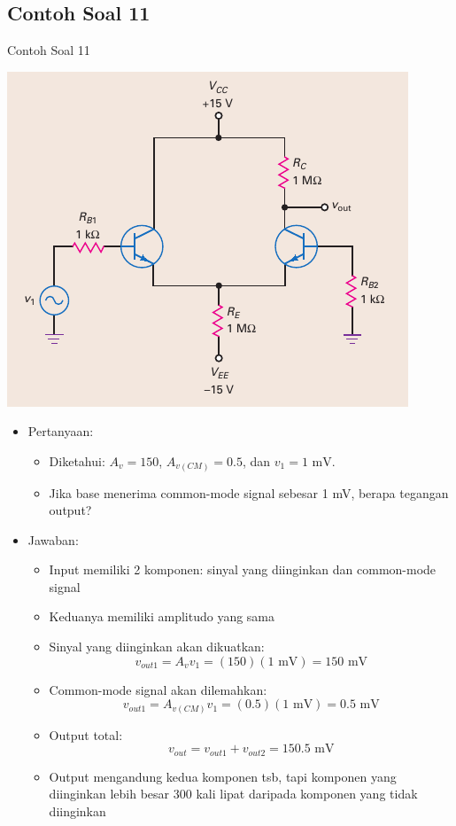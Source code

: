 \documentclass[aspectratio=169]{beamer}
\begin{document}
\subsection{Contoh Soal 11}
\begin{frame}{Contoh Soal 11}
	\begin{multicols}{2}
		\begin{center}
			\includegraphics[width=\linewidth, height=0.7\textheight]{gambar/01.diff-amp/01.fig22}
		\end{center}
		\columnbreak
		\begin{itemize}
			\item Pertanyaan:
			\begin{itemize}
				\item Diketahui: $ A_v = 150 $, $ A_{v(CM)} = 0.5 $, dan $ v_1 = 1 \text{ mV} $.
				\item Jika base menerima common-mode signal sebesar 1 mV, berapa tegangan output?
			\end{itemize}
			\item Jawaban:
			\begin{itemize}
				\item Input memiliki 2 komponen: sinyal yang diinginkan dan common-mode signal
				\item Keduanya memiliki amplitudo yang sama
				\item Sinyal yang diinginkan akan dikuatkan:
				\[ v_{out1} = A_v v_1 = (150)(1 \text{ mV}) = 150 \text{ mV} \]
				\item Common-mode signal akan dilemahkan:
				\[ v_{out1} = A_{v(CM)} v_1 = (0.5)(1 \text{ mV}) = 0.5 \text{ mV} \]
				\item Output total:
				\[ v_{out} = v_{out1} + v_{out2} = 150.5 \text{ mV} \]
				\item Output mengandung kedua komponen tsb, tapi komponen yang diinginkan lebih besar 300 kali lipat daripada komponen yang tidak diinginkan
			\end{itemize}
		\end{itemize}
	\end{multicols}
\end{frame}
\end{document}
